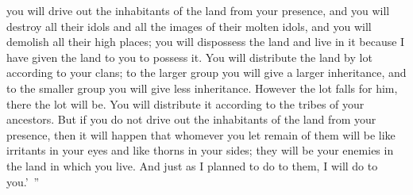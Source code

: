 \begin{biblechapter}
\verse you will drive out the inhabitants of the land from your presence, and you will destroy all their idols and all the images of their molten idols, and you will demolish all their high places;
\verse you will dispossess the land and live in it because I have given the land to you to possess it.
\verse You will distribute the land by lot according to your clans; to the larger group you will give a larger inheritance, and to the smaller group you will give less inheritance. However the lot falls for him, there the lot will be. You will distribute it according to the tribes of your ancestors.
\verse But if you do not drive out the inhabitants of the land from your presence, then it will happen that whomever you let remain of them will be like irritants in your eyes and like thorns in your sides; they will be your enemies in the land in which you live.
\verse And just as I planned to do to them, I will do to you.’ ”
\end{biblechapter}

